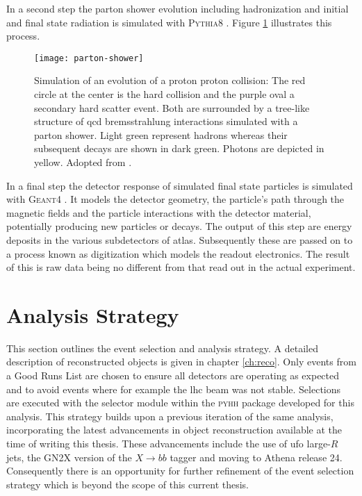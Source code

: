 In a second step the parton shower evolution including hadronization and initial and final state radiation is simulated with \textsc{Pythia8} \citep{Sjostrand:2014zea}. Figure \ref{fig:parton_shower} illustrates this process.
\begin{figure}[]
    \centering
    \texttt{[image: parton-shower]}
    \caption{Simulation of an evolution of a proton proton collision: The red circle at the center is the hard collision and the purple oval a secondary hard scatter event. Both are surrounded by a tree-like structure of \ac{qcd} bremsstrahlung interactions simulated with a parton shower. Light green represent hadrons whereas their subsequent decays are shown in dark green. Photons are depicted in yellow. Adopted from \citep{Hoche:2014rga}.
        \label{fig:parton_shower}}
\end{figure}

In a final step the detector response of simulated final state particles is simulated with \textsc{Geant}4 \citep{Agostinelli:2002hh}. It models the detector geometry, the particle's path through the magnetic fields and the particle interactions with the detector material, potentially producing new particles or decays. The output of this step are energy deposits in the various subdetectors of \ac{atlas}. Subsequently these are passed on to a process known as digitization which models the readout electronics. The result of this is raw data being no different from that read out in the actual experiment.

\section{Analysis Strategy}\label{sec:hh4b_analysis_strategy}
This section outlines the event selection and analysis strategy. A detailed description of reconstructed objects is given in chapter \ref{ch:reco}. Only events from a Good Runs List are chosen to ensure all detectors are operating as expected and to avoid events where for example the \ac{lhc} beam was not stable. Selections are executed with the selector module within the \textsc{pyhh} \citep{pyhh} package developed for this analysis. This strategy builds upon a previous iteration of the same analysis, incorporating the latest advancements in object reconstruction available at the time of writing this thesis. These advancements include the use of \ac{ufo} large-$R$ jets, the GN2X version of the $X\rightarrow bb$ tagger and moving to Athena \citep{Athena} release 24. Consequently there is an opportunity for further refinement of the event selection strategy which is beyond the scope of this current thesis.

